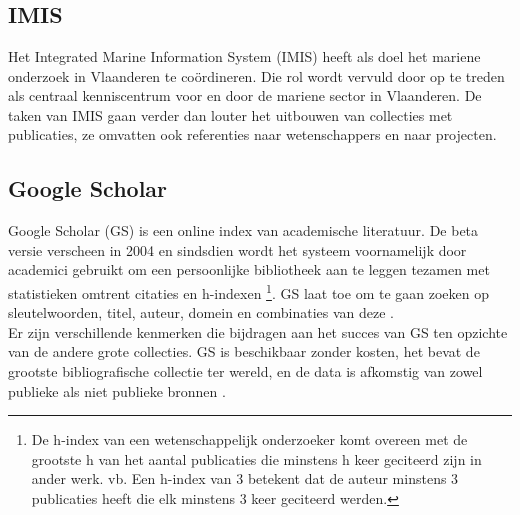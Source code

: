 \chapter{}%
\label{ch:stand-van-zaken}


\section{IMIS}
Het Integrated Marine Information System (IMIS) \autocite{Haspeslagh2024} heeft als doel het mariene onderzoek in Vlaanderen te coördineren. Die rol wordt vervuld door op te treden als centraal kenniscentrum voor en door de mariene sector in Vlaanderen. De taken van IMIS gaan verder dan louter het uitbouwen van collecties met publicaties, ze omvatten ook referenties naar wetenschappers en naar projecten.
\section{Google Scholar}
Google Scholar (GS) is een online index van academische literatuur. De beta versie verscheen in 2004 en sindsdien wordt het systeem voornamelijk door academici gebruikt om een persoonlijke bibliotheek aan te leggen tezamen met statistieken omtrent citaties en h-indexen \footnote{De h-index van een wetenschappelijk onderzoeker komt overeen met de grootste h van het aantal publicaties die minstens h keer geciteerd zijn in ander werk. vb. Een h-index van 3 betekent dat de auteur minstens 3 publicaties heeft die elk minstens 3 keer geciteerd werden.}. GS laat toe om te gaan zoeken op sleutelwoorden, titel, auteur, domein en combinaties van deze \autocite{Noruzi2005}.\\
Er zijn verschillende kenmerken die bijdragen aan het succes van GS ten opzichte van de andere grote collecties. GS is beschikbaar zonder kosten, het bevat de grootste bibliografische collectie ter wereld, en de data is afkomstig van zowel publieke als niet publieke bronnen \autocite{Aguillo2011}.
